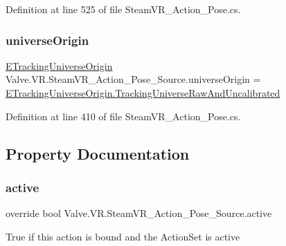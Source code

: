 Definition at line 525 of file Steam\+V\+R\+\_\+\+Action\+\_\+\+Pose.\+cs.

\mbox{\label{class_valve_1_1_v_r_1_1_steam_v_r___action___pose___source_a84921c535f9dbe0abdab0b905b383305}} 
\subsubsection{\texorpdfstring{universeOrigin}{universeOrigin}}
{\footnotesize\ttfamily \mbox{\hyperlink{namespace_valve_1_1_v_r_a29be99a3c2f780157bd490db06a7f12f}{E\+Tracking\+Universe\+Origin}} Valve.\+V\+R.\+Steam\+V\+R\+\_\+\+Action\+\_\+\+Pose\+\_\+\+Source.\+universe\+Origin = \mbox{\hyperlink{namespace_valve_1_1_v_r_a29be99a3c2f780157bd490db06a7f12fa593c08eda033db867fc77728927d5554}{E\+Tracking\+Universe\+Origin.\+Tracking\+Universe\+Raw\+And\+Uncalibrated}}}



Definition at line 410 of file Steam\+V\+R\+\_\+\+Action\+\_\+\+Pose.\+cs.



\subsection{Property Documentation}
\mbox{\label{class_valve_1_1_v_r_1_1_steam_v_r___action___pose___source_a92f914b4e3978b25338835f695a437e0}} 
\subsubsection{\texorpdfstring{active}{active}}
{\footnotesize\ttfamily override bool Valve.\+V\+R.\+Steam\+V\+R\+\_\+\+Action\+\_\+\+Pose\+\_\+\+Source.\+active\hspace{0.3cm}{\ttfamily [get]}}



True if this action is bound and the Action\+Set is active 



